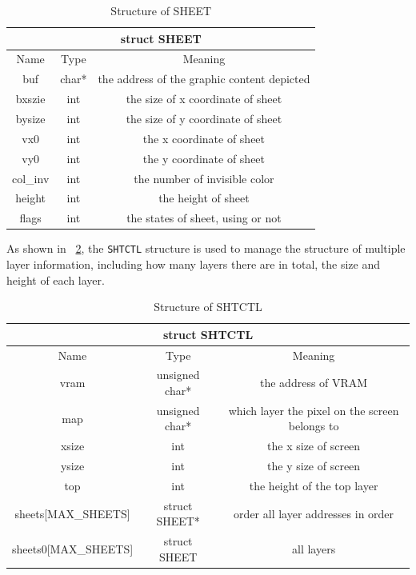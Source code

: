\documentclass{swfcthesis}
\begin{document}
\begin{table}[!htbp]
  \centering
  \begin{tabular}{|c|c|c|}
    \hline
    \multicolumn{3}{|c|}{struct SHEET} \\
    \hline
    Name & Type & Meaning \\
    \hline
    buf & char* & the address of the graphic content depicted \\
    \hline
    bxszie & int & the size of x coordinate of sheet \\
    \hline
    bysize & int & the size of y coordinate of sheet \\
    \hline
    vx0 & int & the x coordinate of sheet \\
    \hline
    vy0 & int & the y coordinate of sheet \\
    \hline
    col\_inv & int & the number of invisible color \\
    \hline
    height & int & the height of sheet \\
    \hline
    flags & int & the states of sheet, using or not \\
    \hline
  \end{tabular}
  \caption{Structure of SHEET}
  \label{tab:SHEET}
\end{table}

As shown in ~\ref{tab:SHTCTL}, the \texttt{SHTCTL} structure is used to manage the structure
of multiple layer information, including how many layers there are in total, the size and
height of each layer.
\begin{table}[!htbp]
  \centering
  \begin{tabular}{|c|c|c|}
    \hline
    \multicolumn{3}{|c|}{struct SHTCTL} \\
    \hline
    Name & Type & Meaning \\
    \hline
    vram & unsigned char* & the address of VRAM \\
    \hline
    map & unsigned char* & which layer the pixel on the screen belongs to \\
    \hline
    xsize & int & the x size of screen \\
    \hline
    ysize & int & the y size of screen \\
    \hline
    top & int & the height of the top layer \\
    \hline
    sheets[MAX\_SHEETS] & struct SHEET* & order all layer addresses in order \\
    \hline
    sheets0[MAX\_SHEETS] & struct SHEET & all layers \\
    \hline
  \end{tabular}
  \caption{Structure of SHTCTL}
  \label{tab:SHTCTL}
\end{table}
\end{document}
